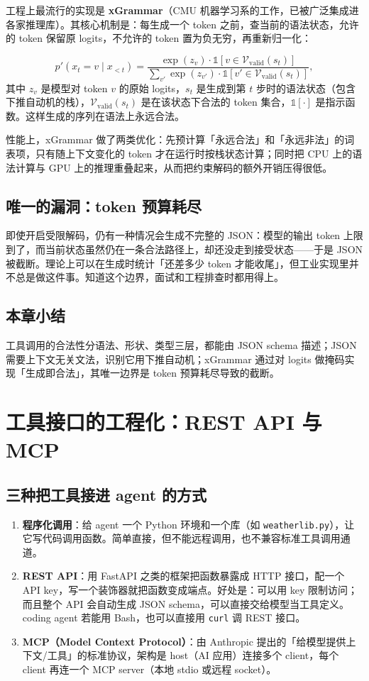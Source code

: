 \documentclass[a4paper]{article}
\begin{document}
工程上最流行的实现是 \textbf{xGrammar}（CMU 机器学习系的工作，已被广泛集成进各家推理库）。其核心机制是：每生成一个 token 之前，查当前的语法状态，允许的 token 保留原 logits，不允许的 token 置为负无穷，再重新归一化：

$$
p'(x_t = v \mid x_{<t}) =
\frac{\exp(z_v)\cdot \mathbb{1}[v \in \mathcal{V}_{\text{valid}}(s_t)]}
{\sum_{v'}\exp(z_{v'})\cdot \mathbb{1}[v' \in \mathcal{V}_{\text{valid}}(s_t)]},
$$
其中 $z_v$ 是模型对 token $v$ 的原始 logits，$s_t$ 是生成到第 $t$ 步时的语法状态（包含下推自动机的栈），$\mathcal{V}_{\text{valid}}(s_t)$ 是在该状态下合法的 token 集合，$\mathbb{1}[\cdot]$ 是指示函数。这样生成的序列在语法上永远合法。

性能上，xGrammar 做了两类优化：先预计算「永远合法」和「永远非法」的词表项，只有随上下文变化的 token 才在运行时按栈状态计算；同时把 CPU 上的语法计算与 GPU 上的推理重叠起来，从而把约束解码的额外开销压得很低。

\subsection{唯一的漏洞：token 预算耗尽}

即使开启受限解码，仍有一种情况会生成不完整的 JSON：模型的输出 token 上限到了，而当前状态虽然仍在一条合法路径上，却还没走到接受状态——于是 JSON 被截断。理论上可以在生成时统计「还差多少 token 才能收尾」，但工业实现里并不总是做这件事。知道这个边界，面试和工程排查时都用得上。

\subsection{本章小结}
工具调用的合法性分语法、形状、类型三层，都能由 JSON schema 描述；JSON 需要上下文无关文法，识别它用下推自动机；xGrammar 通过对 logits 做掩码实现「生成即合法」，其唯一边界是 token 预算耗尽导致的截断。

\section{工具接口的工程化：REST API 与 MCP}

\subsection{三种把工具接进 agent 的方式}

\begin{enumerate}
\item \textbf{程序化调用}：给 agent 一个 Python 环境和一个库（如 \texttt{weatherlib.py}），让它写代码调用函数。简单直接，但不能远程调用，也不兼容标准工具调用通道。
\item \textbf{REST API}：用 FastAPI 之类的框架把函数暴露成 HTTP 接口，配一个 API key，写一个装饰器就把函数变成端点。好处是：可以用 key 限制访问；而且整个 API 会自动生成 JSON schema，可以直接交给模型当工具定义。coding agent 若能用 Bash，也可以直接用 \texttt{curl} 调 REST 接口。
\item \textbf{MCP（Model Context Protocol）}：由 Anthropic 提出的「给模型提供上下文/工具」的标准协议，架构是 host（AI 应用）连接多个 client，每个 client 再连一个 MCP server（本地 stdio 或远程 socket）。
\end{enumerate}
\end{document}
